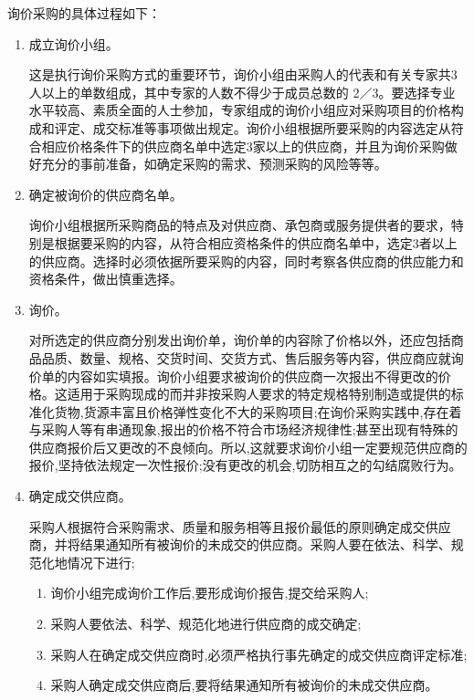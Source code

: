     询价采购的具体过程如下：
    \begin{enumerate}
        \item  成立询价小组。

        这是执行询价采购方式的重要环节，询价小组由采购人的代表和有关专家共3人以上的单数组成，其中专家的人数不得少于成员总数的 2／3。要选择专业水平较高、素质全面的人士参加，专家组成的询价小组应对采购项目的价格构成和评定、成交标准等事项做出规定。询价小组根据所要采购的内容选定从符合相应价格条件下的供应商名单中选定3家以上的供应商，并且为询价采购做好充分的事前准备，如确定采购的需求、预测采购的风险等等。

        \item  确定被询价的供应商名单。

        询价小组根据所采购商品的特点及对供应商、承包商或服务提供者的要求，特别是根据要采购的内容，从符合相应资格条件的供应商名单中，选定3者以上的供应商。选择时必须依据所要采购的内容，同时考察各供应商的供应能力和资格条件，做出慎重选择。

        \item  询价。

        对所选定的供应商分别发出询价单，询价单的内容除了价格以外，还应包括商品品质、数量、规格、交货时间、交货方式、售后服务等内容，供应商应就询价单的内容如实填报。询价小组要求被询价的供应商一次报出不得更改的价格。这适用于采购现成的而并非按采购人要求的特定规格特别制造或提供的标准化货物,货源丰富且价格弹性变化不大的采购项目;在询价采购实践中,存在着与采购人等有串通现象,报出的价格不符合市场经济规律性;甚至出现有特殊的供应商报价后又更改的不良倾向。所以,这就要求询价小组一定要规范供应商的报价,坚持依法规定一次性报价;没有更改的机会,切防相互之的勾结腐败行为。

        \item  确定成交供应商。

        采购人根据符合采购需求、质量和服务相等且报价最低的原则确定成交供应商，并将结果通知所有被询价的未成交的供应商。采购人要在依法、科学、规范化地情况下进行;

          \begin{enumerate}
              \item  询价小组完成询价工作后,要形成询价报告,提交给采购人;
              \item  采购人要依法、科学、规范化地进行供应商的成交确定;
              \item  采购人在确定成交供应商时,必须严格执行事先确定的成交供应商评定标准;
              \item  采购人确定成交供应商后,要将结果通知所有被询价的未成交供应商。
            \end{enumerate}
    \end{enumerate}

